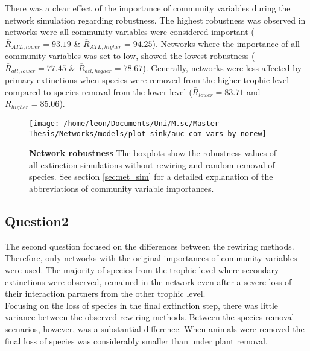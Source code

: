 \documentclass[12pt,a4paper]{article}
\begin{document}
There was a clear effect of the importance of community variables during the network simulation regarding robustness. The highest robustness was observed in networks were all community variables were considered important ($\overline{R}_{ATL, lower} = 93.19$ \& $\overline{R}_{ATL, higher} = 94.25$). Networks where the importance of all community variables was set to low, showed the lowest robustness ($\overline{R}_{atl, lower} = 77.45$ \& $\overline{R}_{atl, higher} = 78.67$). Generally, networks were less affected by primary extinctions when species were removed from the higher trophic level compared to species removal from the lower level ($\overline{R}_{lower} = 83.71 $ and $\overline{R}_{higher} = 85.06$). \par


\begin{figure}[H]
	 \texttt{[image: /home/leon/Documents/Uni/M.sc/Master Thesis/Networks/models/plot\_sink/auc\_com\_vars\_by\_norew]}
	 \caption{\textbf{Network robustness } The boxplots show the robustness values of all extinction simulations without rewiring and random removal of species. See section \ref{sec:net_sim} for a detailed explanation of the abbreviations of community variable importances.}
	 \label{fig:auc_cv_norew}
\end{figure}



\subsection{Question2}

The second question focused on the differences between the rewiring methods. Therefore, only networks with the original importances of community variables were used. The majority of species from the trophic level where secondary extinctions were observed, remained in the network even after a severe loss of their interaction partners from the other trophic level.
\\ Focusing on the loss of species in the final extinction step, there was little variance between the observed rewiring methods. Between the species removal scenarios, however, was a substantial difference. When animals were removed the final loss of species was considerably smaller than under plant removal. \par
\end{document}

